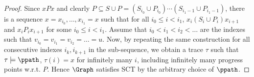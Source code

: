 \begin{proof}
Since $x P x$ and clearly $P \subseteq S \cup P = (S_{i_0} \cup P_{i_0}) \cdots (S_{i_1-1} \cup P_{i_1-1})$, there is a sequence $x = x_{i_0}, \ldots , x_{i_1} =x$ such that for all $i_{0} \leq i < i_1$, $x_i(S_{i} \cup P_{i}) x_{i+1}$ %
and $x_i P_{i} x_{i+1}$ for some $i_{0} \leq i < i_1$.
Assume that $i_0 < i_1 < i_2 < \ldots$ are the indexes such that 
$v_{i_0} = v_{i_1} = v_{i_2} = \ldots = u$.
Now, by repeating the same construction for all consecutive indexes $i_k, i_{k+1}$ in the
sub-sequence, 
 we obtain a trace $\tau$ such that $\tau \models \ppath$, $\tau(i) = x$ for infinitely many $i$, 
 including infinitely many progress points w.r.t. $P$. 
 Hence $\Graph$ satisfies SCT by the arbitrary choice of $\ppath$.
\end{proof}



